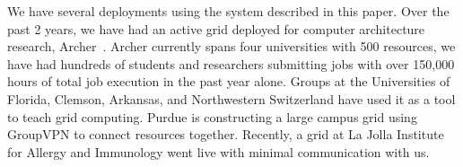 \documentclass{sig-alternate}
\begin{document}
We have several deployments using the system described in this paper.  Over
the past 2 years, we have had an active grid deployed for computer architecture
research, Archer~\cite{archer}.  Archer currently spans four universities with
500 resources, we have had hundreds of students and researchers submitting jobs
with over 150,000 hours of total job execution in the past year alone.  Groups
at the Universities of Florida, Clemson, Arkansas, and Northwestern Switzerland
have used it as a tool to teach grid computing.  Purdue is constructing a large
campus grid using GroupVPN to connect resources together.  Recently, a grid at
La Jolla Institute for Allergy and Immunology went live with minimal
communication with us.


\small{

\suppressfloats
}
\end{document}
